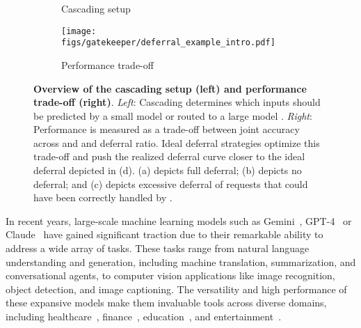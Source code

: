 \begin{figure}[t]
\centering

\begin{subfigure}[b]{0.66\linewidth}
  \centering
  \resizebox{\linewidth}{!}{}
  \caption{Cascading setup}
  \label{fig:cascade_schema}
\end{subfigure}
\hfill
\begin{subfigure}[b]{0.3\linewidth}
  \centering
  \texttt{[image: figs/gatekeeper/deferral\_example\_intro.pdf]}
  \caption{Performance trade-off}
  \label{fig:cascade_performance}
\end{subfigure}

\caption[\textbf{Overview of the cascading setup (left) and performance trade-off (right).}]{\textbf{Overview of the cascading setup (left) and performance trade-off (right)}. \emph{Left}: Cascading determines which inputs should be predicted by a small model \smallmodel or routed to a large model \bigmodel. \emph{Right}: Performance is measured as a trade-off between joint accuracy across \smallmodel and \bigmodel and deferral ratio. Ideal deferral strategies optimize this trade-off and push the realized deferral curve closer to the ideal deferral depicted in (d). (a) depicts full deferral; (b) depicts no deferral; and (c) depicts excessive deferral of requests that could have been correctly handled by \smallmodel.}
\label{fig:deferral_example_intro}
\end{figure}


In recent years, large-scale machine learning models such as Gemini~\citep{team2023gemini}, GPT-4~\citep{achiam2023gpt} or Claude~\citep{antropicmodels} have gained significant traction due to their remarkable ability to address a wide array of tasks. These tasks range from natural language understanding and generation, including machine translation, summarization, and conversational agents, to computer vision applications like image recognition, object detection, and image captioning. The versatility and high performance of these expansive models make them invaluable tools across diverse domains, including healthcare~\citep{llm_healthcare}, finance~\citep{llm_finance}, education~\citep{llm_education}, and entertainment~\citep{llm_games}.

